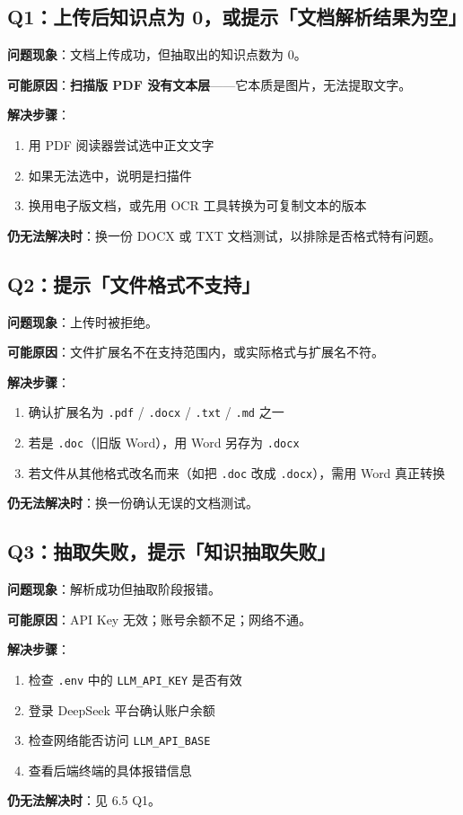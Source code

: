 \documentclass[UTF8,a4paper,11pt]{ctexrep}
\begin{document}
\subsection{Q1：上传后知识点为 0，或提示「文档解析结果为空」}

\textbf{问题现象}：文档上传成功，但抽取出的知识点数为 0。

\textbf{可能原因}：\textbf{扫描版 PDF 没有文本层}——它本质是图片，无法提取文字。

\textbf{解决步骤}：

\begin{enumerate}
\item 用 PDF 阅读器尝试选中正文文字
\item 如果无法选中，说明是扫描件
\item 换用电子版文档，或先用 OCR 工具转换为可复制文本的版本
\end{enumerate}
\textbf{仍无法解决时}：换一份 DOCX 或 TXT 文档测试，以排除是否格式特有问题。


\subsection{Q2：提示「文件格式不支持」}

\textbf{问题现象}：上传时被拒绝。

\textbf{可能原因}：文件扩展名不在支持范围内，或实际格式与扩展名不符。

\textbf{解决步骤}：

\begin{enumerate}
\item 确认扩展名为 \texttt{.pdf} / \texttt{.docx} / \texttt{.txt} / \texttt{.md} 之一
\item 若是 \texttt{.doc}（旧版 Word），用 Word 另存为 \texttt{.docx}
\item 若文件从其他格式改名而来（如把 \texttt{.doc} 改成 \texttt{.docx}），需用 Word 真正转换
\end{enumerate}
\textbf{仍无法解决时}：换一份确认无误的文档测试。


\subsection{Q3：抽取失败，提示「知识抽取失败」}

\textbf{问题现象}：解析成功但抽取阶段报错。

\textbf{可能原因}：API Key 无效；账号余额不足；网络不通。

\textbf{解决步骤}：

\begin{enumerate}
\item 检查 \texttt{.env} 中的 \texttt{LLM\_API\_KEY} 是否有效
\item 登录 DeepSeek 平台确认账户余额
\item 检查网络能否访问 \texttt{LLM\_API\_BASE}
\item 查看后端终端的具体报错信息
\end{enumerate}
\textbf{仍无法解决时}：见 6.5 Q1。
\end{document}
